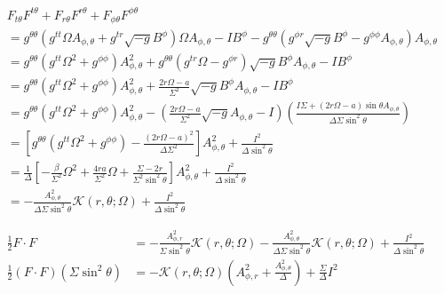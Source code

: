 \documentclass[aps,prd,preprint,groupedaddress]{revtex4-1}
\def\nn{\nonumber}
\def\st{\sin\theta}
\def\sst{\sin^2\theta}
\def\Ar{A_{\phi,r}}
\def\Ah{A_{\phi,\theta}}
\def\g{\sqrt{-g}}
\begin{document}
\begin{align}
& F_{t\theta}F^{t\theta} + F_{r\theta}F^{r\theta} + F_{\phi\theta}F^{\phi\theta} \\
&
= g^{\theta\theta}(g^{tt}\Omega \Ah +g^{tr}\g B^\phi) \Omega\Ah
-I B^\phi - g^{\theta\theta}(g^{\phi r}\g B^\phi-g^{\phi\phi}\Ah)\Ah \nn\\
&
= g^{\theta\theta}(g^{tt}\Omega^2+g^{\phi\phi})\Ah^2
+ g^{\theta\theta}(g^{tr}\Omega-g^{\phi r})\sqrt{-g}B^\phi\Ah-IB^\phi \nn\\
&
= g^{\theta\theta}(g^{tt}\Omega^2+g^{\phi\phi})\Ah^2
+ \frac{2r\Omega-a}{\Sigma^2}\sqrt{-g}B^\phi\Ah-IB^\phi \nn \\
&
= g^{\theta\theta}(g^{tt}\Omega^2+g^{\phi\phi})\Ah^2
- \left(\frac{2r\Omega-a}{\Sigma^2}\sqrt{-g}\Ah-I \right)
\left(\frac{I\Sigma+(2r\Omega-a)\st\Ah}{\Delta\Sigma\sst}\right)\nn\\
&
= \left[g^{\theta\theta}(g^{tt}\Omega^2+g^{\phi\phi})- \frac{(2r\Omega-a)^2}{\Delta\Sigma^2}\right]\Ah^2
+\frac{I^2}{\Delta\sst} \nn\\
&
= \frac{1}{\Delta} \left[-\frac{\beta}{\Sigma^2}\Omega^2 +  \frac{4ra}{\Sigma^2}\Omega
+\frac{\Sigma-2r}{\Sigma^2\sst}  \right] \Ah^2 +\frac{I^2}{\Delta\sst} \nn\\
&
=-\frac{\Ah^2}{\Delta\Sigma\sst} \mathcal K(r,\theta; \Omega) + \frac{I^2}{\Delta\sst}
\end{align}

\begin{align}
    \frac{1}{2}F\cdot F
&= -\frac{\Ar^2}{\Sigma\sst} \mathcal K(r,\theta; \Omega)
    -\frac{\Ah^2}{\Delta\Sigma\sst} \mathcal K(r,\theta; \Omega) + \frac{I^2}{\Delta\sst}\nn \\
\frac{1}{2}( F\cdot F ) (\Sigma\sst)
&= -\mathcal K(r,\theta; \Omega)\left(\Ar^2 +\frac{\Ah^2}{\Delta} \right) + \frac{\Sigma }{\Delta} I^2
\end{align}
\end{document}
